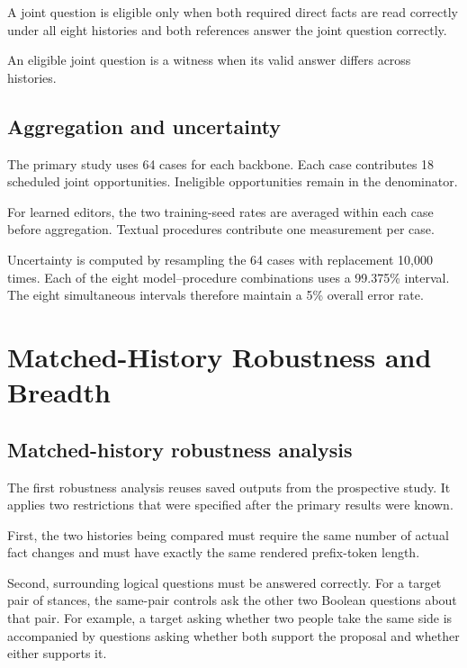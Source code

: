 \documentclass{article}
\begin{document}
A joint question is eligible only when both required direct facts are read
correctly under all eight histories and both references answer the joint
question correctly.

An eligible joint question is a witness when its valid answer differs across
histories.

\subsection{Aggregation and uncertainty}

The primary study uses 64 cases for each backbone. Each case contributes 18
scheduled joint opportunities. Ineligible opportunities remain in the
denominator.

For learned editors, the two training-seed rates are averaged within each
case before aggregation. Textual procedures contribute one measurement per
case.

Uncertainty is computed by resampling the 64 cases with replacement
10,000 times. Each of the eight model--procedure combinations uses a
99.375\% interval. The eight simultaneous intervals therefore maintain a
5\% overall error rate.



\section{Matched-History Robustness and Breadth}
\label{app:matched-history-robustness}

\subsection{Matched-history robustness analysis}

The first robustness analysis reuses saved outputs from the prospective
study. It applies two restrictions that were specified after the primary
results were known.

First, the two histories being compared must require the same number of
actual fact changes and must have exactly the same rendered prefix-token
length.

Second, surrounding logical questions must be answered correctly. For a
target pair of stances, the same-pair controls ask the other two Boolean
questions about that pair. For example, a target asking whether two people
take the same side is accompanied by questions asking whether both support
the proposal and whether either supports it.
\end{document}
